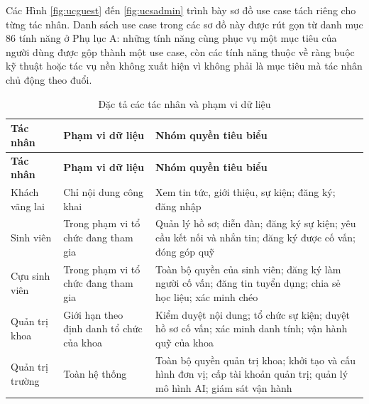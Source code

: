 \documentclass[12pt,a4paper,oneside]{report}
\begin{document}
Các Hình \ref{fig:ucguest} đến \ref{fig:ucsadmin} trình bày sơ đồ use case tách riêng cho từng tác nhân. Danh sách use case trong các sơ đồ này được rút gọn từ danh mục 86 tính năng ở Phụ lục A: những tính năng cùng phục vụ một mục tiêu của người dùng được gộp thành một use case, còn các tính năng thuộc về ràng buộc kỹ thuật hoặc tác vụ nền không xuất hiện vì không phải là mục tiêu mà tác nhân chủ động theo đuổi.

\renewcommand{\arraystretch}{1.2}
\begin{longtable}{|>{\raggedright\arraybackslash}p{3.0cm}|>{\raggedright\arraybackslash}p{5.2cm}|>{\raggedright\arraybackslash}p{6.3cm}|}
\caption{Đặc tả các tác nhân và phạm vi dữ liệu}\label{tab:actors}\\
\hline \textbf{Tác nhân} & \textbf{Phạm vi dữ liệu} & \textbf{Nhóm quyền tiêu biểu} \\ \hline
\endfirsthead
\hline \textbf{Tác nhân} & \textbf{Phạm vi dữ liệu} & \textbf{Nhóm quyền tiêu biểu} \\ \hline
\endhead
Khách vãng lai & Chỉ nội dung công khai & Xem tin tức, giới thiệu, sự kiện; đăng ký; đăng nhập \\ \hline
Sinh viên & Trong phạm vi tổ chức đang tham gia & Quản lý hồ sơ; diễn đàn; đăng ký sự kiện; yêu cầu kết nối và nhắn tin; đăng ký được cố vấn; đóng góp quỹ \\ \hline
Cựu sinh viên & Trong phạm vi tổ chức đang tham gia & Toàn bộ quyền của sinh viên; đăng ký làm người cố vấn; đăng tin tuyển dụng; chia sẻ học liệu; xác minh chéo \\ \hline
Quản trị khoa & Giới hạn theo định danh tổ chức của khoa & Kiểm duyệt nội dung; tổ chức sự kiện; duyệt hồ sơ cố vấn; xác minh danh tính; vận hành quỹ của khoa \\ \hline
Quản trị trường & Toàn hệ thống & Toàn bộ quyền quản trị khoa; khởi tạo và cấu hình đơn vị; cấp tài khoản quản trị; quản lý mô hình AI; giám sát vận hành \\ \hline
\end{longtable}
\renewcommand{\arraystretch}{1}
\end{document}
